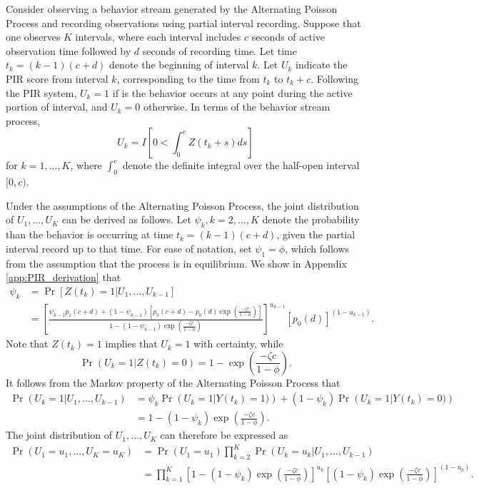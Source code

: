 \documentclass[man, noextraspace, floatsintext]{apa6}\usepackage[]{graphicx}\usepackage[]{color}
\begin{document}
Consider observing a behavior stream generated by the Alternating Poisson Process and recording observations using partial interval recording. 
Suppose that one observes $K$ intervals, where each interval includes $c$ seconds of active observation time followed by $d$ seconds of recording time. 
Let time $t_k = (k-1)(c + d)$ denote the beginning of interval $k$. Let $U_k$ indicate the PIR score from interval $k$, corresponding to the time from $t_k$ to $t_k + c$. 
Following the PIR system, $U_k = 1$ if is the behavior occurs at any point during the active portion of interval, and $U_k = 0$ otherwise. 
In terms of the behavior stream process, 
\begin{equation}
U_k = I\left[ 0 < \int_0^c Z\left(t_k + s \right) ds\right]
\end{equation}
for $k = 1,...,K$, where $\int_0^c$ denote the definite integral over the half-open interval $[0,c)$.

Under the assumptions of the Alternating Poisson Process, the joint distribution of $U_1,...,U_K$ can be derived as follows. 
Let $\psi_k, k = 2,...,K$ denote the probability than the behavior is occurring at time $t_k = (k-1)(c + d)$, given the partial interval record up to that time. 
For ease of notation, set $\psi_1 = \phi$, which follows from the assumption that the process is in equilibrium. We show in Appendix \ref{app:PIR_derivation} that  
\begin{equation}
\label{eq:psi_k}
\begin{aligned}
\psi_k &= \Pr\left[ Z(t_k) = 1 \left| U_1,...,U_{k-1}\right.\right] \\
 &= \left[\frac{\psi_{k-1} p_1(c + d) + (1 - \psi_{k-1}) \left[p_0(c + d) - p_0(d) \exp\left(\frac{- \zeta c}{1 - \phi}\right)\right]}{1 - (1 - \psi_{k-1})\exp\left( \frac{-\zeta c}{1 - \phi}\right)}\right]^{u_{k-1}} \left[p_0(d)\right]^{(1 - u_{k-1})}.
\end{aligned}
\end{equation}
Note that $Z(t_k) = 1$ implies that $U_k = 1$ with certainty, while 
\[ \Pr\left(U_k = 1\left| Z(t_k) = 0\right.\right) = 1 - \exp\left( \frac{-\zeta c}{1 - \phi}\right).\]
It follows from the Markov property of the Alternating Poisson Process that 
\begin{align*}
\Pr\left(U_k = 1 \left| U_1,...,U_{k-1}\right.\right) &= \psi_k \Pr\left(U_k = 1 \left| Y(t_k) = 1)\right.\right)  + (1 - \psi_k)\Pr\left(U_k = 1 \left| Y(t_k) = 0)\right.\right) \\
&= 1 - (1 - \psi_k)\exp\left( \frac{-\zeta c}{1 - \phi}\right).
\end{align*}
The joint distribution of $U_1,...,U_K$ can therefore be expressed as 
\begin{align*}
\Pr\left(U_1=u_1,...,U_K = u_K\right) &= \Pr\left(U_1=u_1\right) \prod_{k=2}^K \Pr\left(U_k=u_k \left| U_1,...,U_{k-1}\right.\right) \nonumber \\
&= \prod_{k=1}^K \left[1 - (1 - \psi_k)\exp\left( \frac{-\zeta c}{1 - \phi}\right) \right]^{u_k} \left[(1 - \psi_k)\exp\left( \frac{-\zeta c}{1 - \phi}\right)\right]^{(1 - u_k)}.
\end{align*}
\end{document}
